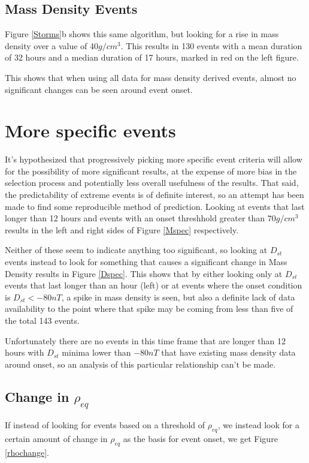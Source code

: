 \documentclass[10pt,twocolumn]{article}
\begin{document}
\subsection{Mass Density Events}
Figure \ref{Storms}b shows this same algorithm, but looking for a rise in mass density over a value of 40$g/cm^3$. This results in 130 events with a mean duration of 32 hours and a median duration of 17 hours, marked in red on the left figure.

This shows that when using all data for mass density derived events, almost no significant changes can be seen around event onset.



\section{More specific events}
It's hypothesized that progressively picking more specific event criteria will allow for the possibility of more significant results, at the expense of more bias in the selection process and potentially less overall usefulness of the results. That said, the predictability of extreme events is of definite interest, so an attempt has been made to find some reproducible method of prediction. Looking at events that last longer than 12 hours and events with an onset threshhold greater than $70g/cm^3$ results in the left and right sides of Figure \ref{Mspec} respectively.



Neither of these seem to indicate anything too significant, so looking at $D_{st}$ events instead to look for something that causes a significant change in Mass Density results in Figure \ref{Dspec}. This shows that by either looking only at $D_{st}$ events that last longer than an hour (left) or at events where the onset condition is $D_{st}<-80nT$, a spike in mass density is seen, but also a definite lack of data availability to the point where that spike may be coming from less than five of the total 143 events. 



Unfortunately there are no events in this time frame that are longer than 12 hours with $D_{st}$ minima lower than $-80nT$ that have existing mass density data around onset, so an analysis of this particular relationship can't be made.

\subsection{Change in $\rho_{eq}$}
If instead of looking for events based on a threshold of $\rho_{eq}$, we instead look for a certain amount of change in $\rho_{eq}$ as the basis for event onset, we get Figure \ref{rhochange}.
\end{document}

